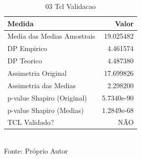 \begin{table}[H]
\centering
\small
\caption{03 Tcl Validacao}
\label{tab:04_03_Teorema_Central_Limite}
\begin{tabular}{|l|r|}
\hline
\textbf{Medida} & \textbf{Valor} \\
\hline
Media das Medias Amostrais & 19.025482 \\
DP Empirico & 4.461574 \\
DP Teorico & 4.487380 \\
Assimetria Original & 17.699826 \\
Assimetria das Medias & 2.298200 \\
p-value Shapiro (Original) & 5.7340e-90 \\
p-value Shapiro (Medias) & 1.2849e-68 \\
TCL Validado? & NÃO \\
\hline
\end{tabular}
\\ \small Fonte: Próprio Autor
\end{table}
